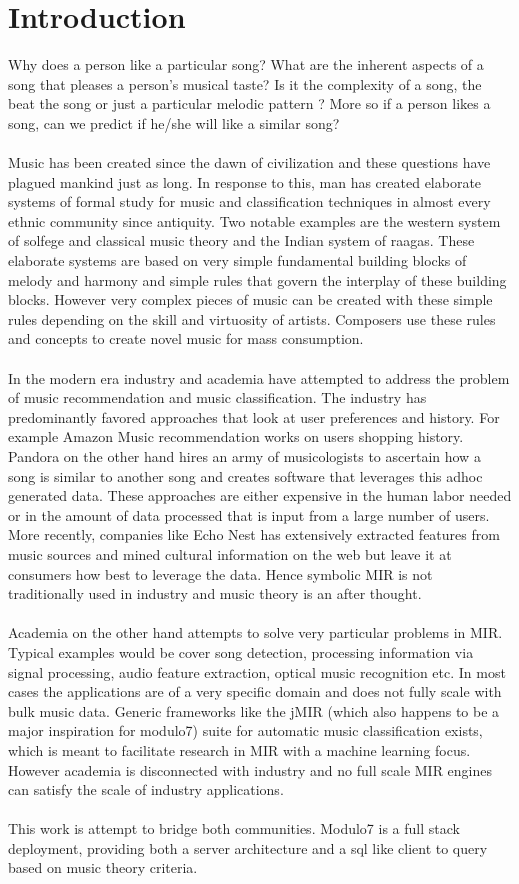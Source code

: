 \chapter{Introduction}
\label{sec:intro}

Why does a person like a particular song? What are the inherent aspects of a song that pleases a person's musical taste? Is it the complexity of a song, the beat the song or just a particular melodic pattern ? More so if a person likes a song, can we predict if he/she will like a similar song? \\\\
Music has been created since the dawn of civilization and these questions have plagued mankind just as long. In response to this, man has created elaborate systems of formal study for music and classification techniques in almost every ethnic community since antiquity. Two notable examples are the western system of solfege and classical music theory and the Indian system of raagas. These elaborate systems are based on very simple fundamental building blocks of melody and harmony and simple rules that govern the interplay of these building blocks. However very complex pieces of music can be created with these simple rules depending on the skill and virtuosity of artists. Composers use these rules and concepts to create novel music for mass consumption. \\\\
In the modern era industry and academia have attempted to address the problem of music recommendation and music classification. The industry has predominantly favored approaches that look at user preferences and history. For example Amazon Music recommendation works on users shopping history. Pandora on the other hand hires an army of musicologists to ascertain how a song is similar to another song and creates software that leverages this adhoc generated data. These approaches are either expensive in the human labor needed or in the amount of data processed that is input from a large number of users. More recently, companies like Echo Nest has extensively extracted features from music sources and mined cultural information on the web but leave it at consumers how best to leverage the data. Hence symbolic MIR is not traditionally used in industry and music theory is an after thought. \\\\
Academia on the other hand attempts to solve very particular problems in MIR. Typical examples would be cover song detection, processing information via signal processing, audio feature extraction, optical music recognition etc. In most cases the applications are of a very specific domain and does not fully scale with bulk music data. Generic frameworks like the jMIR (which also happens to be a major inspiration for modulo7) suite for automatic music classification exists, which is meant to facilitate research in MIR with a machine learning focus. However academia is disconnected with industry and no full scale MIR engines can satisfy the scale of industry applications. \\\\
This work is attempt to bridge both communities. Modulo7 is a full stack deployment, providing both a server architecture and a sql like client to query based on music theory criteria.

